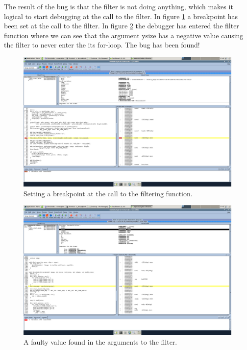 \documentclass[titlepage, a4paper]{article}
\begin{document}
The result of the bug is that the filter is not doing anything, which makes it logical to start debugging at the call to the filter. In figure \ref{fig:totview_breakpoint} a breakpoint has been set at the call to the filter. In figure \ref{fig:totview_variables} the debugger has entered the filter function where we can see that the argument ysize has a negative value causing the filter to never enter the its for-loop. The bug has been found!

\begin{figure}[H]
  \centering
  \includegraphics[scale=0.35, angle=90]{img/totview3.png}
  \caption{Setting a breakpoint at the call to the filtering function.}
  \label{fig:totview_breakpoint}
\end{figure}

\begin{figure}[H]
  \centering
  \includegraphics[scale=0.35, angle=90]{img/totview4.png}
  \caption{A faulty value found in the arguments to the filter.}
  \label{fig:totview_variables}
\end{figure}
\end{document}

